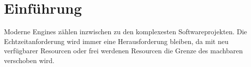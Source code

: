 \chapter{Einführung}

Moderne Engines zählen inzwischen zu den komplexesten Softwareprojekten. Die Echtzeitanforderung wird immer eine Herausforderung bleiben, da mit neu verfügbarer Resourcen oder frei werdenen Resourcen die Grenze des machbaren verschoben wird.